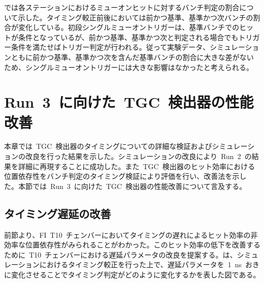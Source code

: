 では各ステーションにおけるミューオンヒットに対するバンチ判定の割合について示した。タイミング較正前後においては前かつ基準、基準かつ次バンチの割合が変化している。初段シングルミューオントリガーは、基準バンチでのヒットが条件となっているが、前かつ基準、基準かつ次と判定される場合でもトリガー条件を満たせばトリガー判定が行われる。従って実験データ、シミュレーションともに前かつ基準、基準かつ次を含んだ基準バンチの割合に大きな差がないため、シングルミューオントリガーには大きな影響はなかったと考えられる。


\section{Run~3~に向けた~TGC~検出器の性能改善}
本章では~TGC~検出器のタイミングについての詳細な検証およびシミュレーションの改良を行った結果を示した。シミュレーションの改良により~Run~2~の結果を詳細に再現することに成功した。また~TGC~検出器のヒット効率における位置依存性をバンチ判定のタイミング検証により評価を行い、改善法を示した。本節では~Run~3~に向けた~TGC~検出器の性能改善について言及する。

\subsection{タイミング遅延の改善}
前節より、FI~T10~チェンバーにおいてタイミングの遅れによるヒット効率の非効率な位置依存性がみられることがわかった。このヒット効率の低下を改善するために~T10~チェンバーにおける遅延パラメータの改良を提案する。は、シミュレーションにおけるタイミング較正を行った上で、遅延パラメータを~1~ns~おきに変化させることでタイミング判定がどのように変化するかを表した図である。

